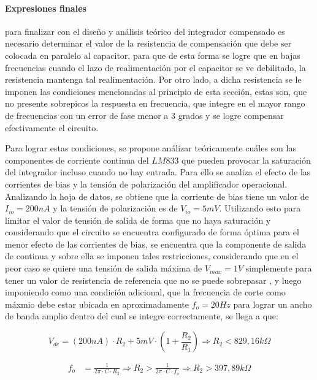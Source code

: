 \paragraph*{Expresiones finales} para finalizar con el dise\~no y an\'alisis te\'orico del integrador compensado es necesario determinar el valor de la resistencia de compensaci\'on que debe ser colocada en paralelo
al capacitor, para que de esta forma se logre que en bajas frecuencias cuando el lazo de realimentaci\'on por el capacitor se ve debilitado, la resistencia mantenga tal realimentaci\'on. Por otro lado, a dicha resistencia se le imponen
las condiciones mencionadas al principio de esta secci\'on, estas son, que no presente sobrepicos la respuesta en frecuencia, que integre en el mayor rango de frecuencias con un error de fase menor a 3 grados y se logre compensar
efectivamente el circuito.

Para lograr estas condiciones, se propone an\'alizar te\'oricamente cu\'ales son las componentes de corriente continua del $LM833$ que pueden provocar la saturaci\'on
del integrador incluso cuando no hay entrada. Para ello se analiza el efecto de las corrientes de bias y la tensi\'on de polarizaci\'on del amplificador operacional.
Analizando la hoja de datos, se obtiene que la corriente de bias tiene un valor de $I_{io} = 200nA$ y la tensi\'on de polarizaci\'on es de
$V_{io} = 5mV$. Utilizando esto para limitar el valor de tensi\'on de salida de forma que no haya saturaci\'on y considerando que el circuito se encuentra configurado
de forma \'optima para el menor efecto de las corrientes de bias, se encuentra que la componente de salida de continua y sobre ella se imponen tales restricciones, considerando que en el peor caso se quiere una tensi\'on de salida m\'axima de $V_{max} = 1V$ simplemente 
para tener un valor de resistencia de referencia que no se puede sobrepasar
, y luego imponiendo como una condici\'on adicional, que la frecuencia de corte como m\'axmio debe estar ubicada en aproximadamente $f_o = 20Hz$ para
 lograr un ancho de banda amplio dentro del cual se integre correctamente, se llega a que:

\begin{equation*}
	V_{dc} = (200nA) \cdot R_2 + 5mV \cdot ( 1 + \frac{R_2}{R_1} )
	\Rightarrow
	R_2 < 829,16 k \Omega 
\end{equation*}

\begin{align*}
	f_o & = \frac{1}{2 \pi \cdot C \cdot R_2} 
	\Rightarrow
	R_2 > \frac{1}{2 \pi \cdot C \cdot f_o}
	\Rightarrow
	R_2 > 397,89k \Omega
\end{align*}

